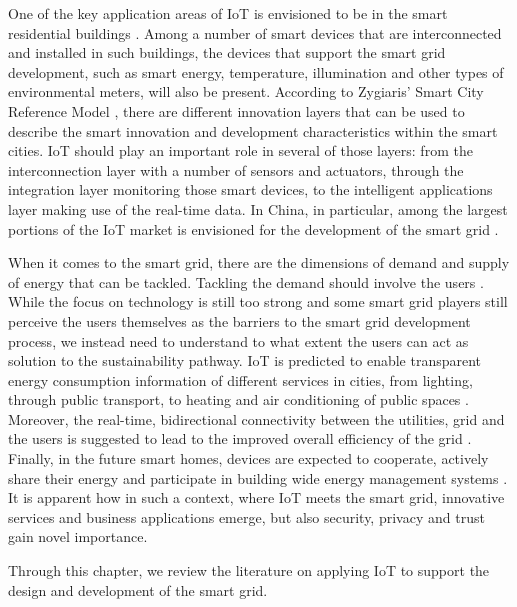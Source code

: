 One of the key application areas of IoT is envisioned to be in the smart residential buildings \cite{schatten2014smart}. Among a number of smart devices that are interconnected and installed in such buildings, the devices that support the smart grid development, such as smart energy, temperature, illumination and other types of environmental meters,  will also be present. According to Zygiaris' Smart City Reference Model \cite{zygiaris2013smart}, there are different innovation layers that can be used to describe the smart innovation and development characteristics within the smart cities. IoT should play an important role in several of those layers: from the interconnection layer with a number of sensors and actuators, through the integration layer monitoring those smart devices, to the intelligent applications layer making use of the real-time data. In China, in particular, among the largest portions of the IoT market is envisioned for the development of the smart grid \cite{shin2014socio}.

When it comes to the smart grid, there are the dimensions of demand and supply of energy that can be tackled. Tackling the demand should involve the users \cite{verbong2013smart}. While the focus on technology is still too strong and some smart grid players still perceive the users themselves as the barriers to the smart grid development process, we instead need to understand to what extent the users can act as solution to the sustainability pathway. IoT is predicted to enable transparent energy consumption information of different services in cities, from lighting, through public transport, to heating and air conditioning of public spaces \cite{zanella2014internet}. Moreover, the real-time, bidirectional connectivity between the utilities, grid and the users is suggested to lead to the improved overall efficiency of the grid \cite{yun2010research,li2011applications}. Finally, in the future smart homes, devices are expected to cooperate, actively share their energy and participate in building wide energy management systems \cite{karnouskos2010cooperative}. It is apparent how in such a context, where IoT meets the smart grid, innovative services and business applications emerge, but also security, privacy and trust gain novel importance.

\begin{svgraybox}
Through this chapter, we review the literature on applying IoT to support the design and development of the smart grid.
\end{svgraybox}

